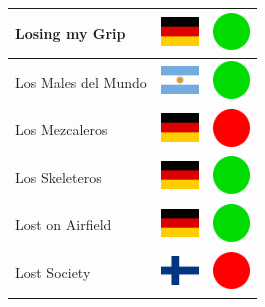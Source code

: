 \documentclass[12pt, a4paper, twoside]{report}
\begin{document}
\begin{center}
\begin{longtable}{|p{5cm}|p{2cm}|p{2cm}|}
 Losing my Grip                                             & \includegraphics[width=1cm]{../img/flags/de} &   \includegraphics[width=1cm]{../likes/y} \\ \hline
 Los Males del Mundo                                        & \includegraphics[width=1cm]{../img/flags/ar} &   \includegraphics[width=1cm]{../likes/y} \\ \hline
 Los Mezcaleros                                             & \includegraphics[width=1cm]{../img/flags/de} &   \includegraphics[width=1cm]{../likes/n} \\ \hline
 Los Skeleteros                                             & \includegraphics[width=1cm]{../img/flags/de} &   \includegraphics[width=1cm]{../likes/y} \\ \hline
 Lost on Airfield                                           & \includegraphics[width=1cm]{../img/flags/de} &   \includegraphics[width=1cm]{../likes/y} \\ \hline
 Lost Society                                               & \includegraphics[width=1cm]{../img/flags/fi} &   \includegraphics[width=1cm]{../likes/n} \\ \hline

\end{longtable}
\end{center}
\end{document}
